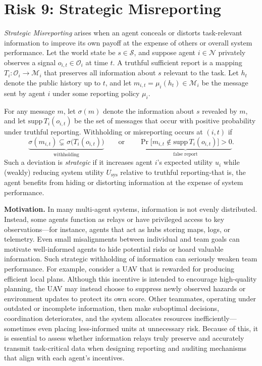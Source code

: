 
\section{Risk 9: Strategic Misreporting}
\label{sec:strategic-withholding}

\begin{boxE}
\textit{Strategic Misreporting} arises when an agent conceals or distorts
task-relevant information to improve its own payoff at the expense of others or overall system
performance. Let the world state be $s \in \mathcal{S}$, and suppose agent $i \in \mathcal{N}$ privately observes
a signal $o_{i,t} \in \mathcal{O}_i$ at time $t$. A truthful sufficient report is a mapping
$T_i : \mathcal{O}_i \to \mathcal{M}_i$ that preserves all information about $s$ relevant to the task.
Let $h_t$ denote the public history up to $t$, and let $m_{i,t} = \mu_i(h_t) \in \mathcal{M}_i$ be the
message sent by agent $i$ under some reporting policy $\mu_i$.

For any message $m$, let $\sigma(m)$ denote the information about $s$ revealed by $m$, and let
$\mathrm{supp}\,T_i(o_{i,t})$ be the set of messages that occur with positive probability under
truthful reporting. Withholding or misreporting occurs at $(i,t)$ if
\[
\underbrace{\sigma(m_{i,t}) \subsetneq \sigma\!\big(T_i(o_{i,t})\big)}_{\text{withholding}}
\qquad\text{or}\qquad
\underbrace{\Pr\!\big[m_{i,t} \notin \mathrm{supp}\,T_i(o_{i,t})\big] > 0}_{\text{false report}}.
\]
Such a deviation is \emph{strategic} if it increases agent $i$'s expected utility $u_i$ while (weakly)
reducing system utility $U_{\mathrm{sys}}$ relative to truthful reporting-that is, the agent benefits
from hiding or distorting information at the expense of system performance.
\end{boxE}



\textbf{Motivation.} In many multi-agent systems, information is not evenly distributed. Instead, some agents function as relays or have privileged access to key observations—for instance, agents that act as hubs storing maps, logs, or telemetry. Even small misalignments between individual and team goals can motivate well-informed agents to hide potential risks or hoard valuable information. Such strategic withholding of information can seriously weaken team performance. For example, consider a UAV that is rewarded for producing efficient local plans. Although this incentive is intended to encourage high-quality planning, the UAV may instead choose to suppress newly observed hazards or environment updates to protect its own score. Other teammates, operating under outdated or incomplete information, then make suboptimal decisions, coordination deteriorates, and the system allocates resources inefficiently—sometimes even placing less-informed units at unnecessary risk.
Because of this, it is essential to assess whether information relays truly preserve and accurately transmit task-critical data when designing reporting and auditing mechanisms that align with each agent’s incentives.

